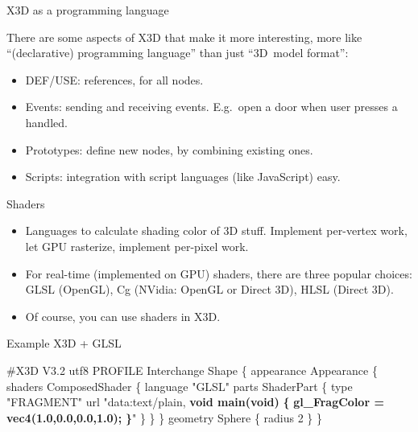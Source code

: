 \documentclass{beamer}
\begin{document}
\begin{frame}{X3D as a programming language}

There are some aspects of X3D that make it more interesting,
more like ``(declarative) programming language'' than just ``3D~model format'':

\begin{itemize}
  \item DEF/USE: references, for all nodes.
  \item Events: sending and receiving events.
    E.g.~open a door when user presses a handled.
  \item Prototypes: define new nodes,
    by combining existing ones.
  \item Scripts: integration with script languages (like JavaScript) easy.
\end{itemize}
\end{frame}

\begin{frame}{Shaders}

\begin{itemize}
  \item Languages to calculate shading color of 3D stuff.
    Implement per-vertex work,
    let GPU rasterize, implement per-pixel work.
  \item For real-time (implemented on GPU) shaders, there are three
    popular choices: GLSL (OpenGL), Cg (NVidia: OpenGL or Direct 3D),
    HLSL (Direct 3D).
  \item Of course, you can use shaders in X3D.
\end{itemize}
\end{frame}

\begin{frame}[fragile]
\begin{exampleblock}{Example X3D + GLSL}
\begin{semiverbatim}
\#X3D V3.2 utf8
PROFILE Interchange
Shape \{
  appearance Appearance \{
    shaders ComposedShader \{
      language "GLSL"
      parts ShaderPart \{
        type "FRAGMENT"
        url "data:text/plain,
        \textbf{void main(void)}
        \textbf{\{}
          \textbf{gl\_FragColor = vec4(1.0,0.0,0.0,1.0);}
        \textbf{\}}" \} \} \}
  geometry Sphere \{ radius 2 \}
\}
\end{semiverbatim}
\end{exampleblock}
\end{frame}
\end{document}
